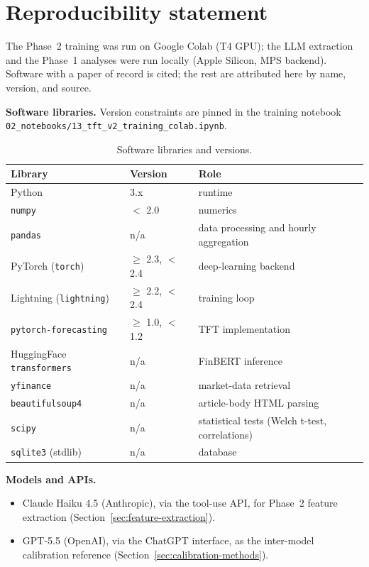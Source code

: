 \chapter{Reproducibility statement}\label{app:reproducibility}

The Phase~2 training was run on Google Colab (T4 GPU); the LLM extraction and the Phase~1 analyses were run locally (Apple Silicon, MPS backend). Software with a paper of record is cited; the rest are attributed here by name, version, and source.

\textbf{Software libraries.} Version constraints are pinned in the training notebook \texttt{02\_notebooks/13\_tft\_v2\_training\_colab.ipynb}.

\begin{table}[h]
  \centering
  \small
  \caption{Software libraries and versions.}
  \label{tab:software}
  \begin{tabular}{@{}lll@{}}
    \toprule
    Library & Version & Role \\
    \midrule
    Python & 3.x & runtime \\
    \texttt{numpy} & $<$ 2.0 & numerics \\
    \texttt{pandas} & n/a & data processing and hourly aggregation \\
    PyTorch (\texttt{torch}) & $\geq$ 2.3, $<$ 2.4 & deep-learning backend \\
    Lightning (\texttt{lightning}) & $\geq$ 2.2, $<$ 2.4 & training loop \\
    \texttt{pytorch-forecasting} & $\geq$ 1.0, $<$ 1.2 & TFT implementation \\
    HuggingFace \texttt{transformers} & n/a & FinBERT inference \citep{wolf2020} \\
    \texttt{yfinance} & n/a & market-data retrieval \\
    \texttt{beautifulsoup4} & n/a & article-body HTML parsing \\
    \texttt{scipy} & n/a & statistical tests (Welch t-test, correlations) \\
    \texttt{sqlite3} (stdlib) & n/a & database \\
    \bottomrule
  \end{tabular}
\end{table}

\textbf{Models and APIs.}
\begin{itemize}
  \item Claude Haiku 4.5 (Anthropic), via the tool-use API, for Phase~2 feature extraction (Section~\ref{sec:feature-extraction}).
  \item GPT-5.5 (OpenAI), via the ChatGPT interface, as the inter-model calibration reference (Section~\ref{sec:calibration-methods}).
\end{itemize}

